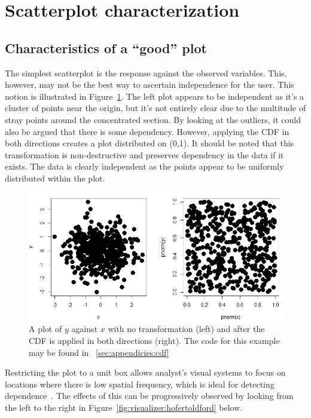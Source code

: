 \section{Scatterplot characterization}
\label{sec:visualizer:scatterplot}

\subsection{Characteristics of a ``good'' plot}
\label{sec:visualizer:scatterplot:goodplot}

The simplest scatterplot is the response against the observed variables. This, however, may not be the best way to ascertain independence for the user. This notion is illustrated in Figure~\ref{fig:visualizer:cdf}. The left plot appears to be independent as it’s a cluster of points near the origin, but it's not entirely clear due to the multitude of stray points around the concentrated section. By looking at the outliers, it could also be argued that there is some dependency. However, applying the CDF in both directions creates a plot distributed on (0,1). It should be noted that this transformation is non-destructive and preserves dependency in the data if it exists. The data is clearly independent as the points appear to be uniformly distributed within the plot.

\begin{figure}[htb]
	\begin{center}
		\includegraphics[width=0.75\linewidth]{ch-visualizer/figures/cdf}
		\caption[A plot of $y$ against $x$ after the CDF is applied in both directions.]{A plot of $y$ against $x$ with no transformation (left) and after the CDF is applied in both directions (right). The code for this example may be found in ~\ref{sec:appendicies:cdf}}
		\label{fig:visualizer:cdf}
	\end{center}
\end{figure}

Restricting the plot to a unit box allows analyst's visual systems to focus on locations where there is low spatial frequency, which is ideal for detecting dependence~\cite{hofert2016}. The effects of this can be progressively observed by looking from the left to the right in Figure~\ref{fig:visualizer:hofertoldford} below.

